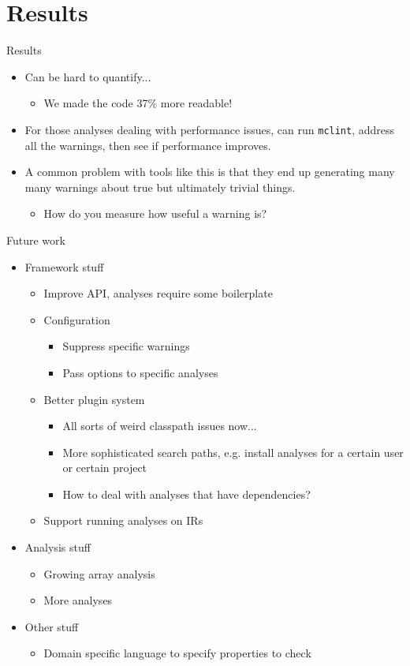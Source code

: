 \documentclass{beamer}
\begin{document}
\section{Results}
\begin{frame}{Results}
\begin{itemize}
\item Can be hard to quantify...
    \begin{itemize}
    \item We made the code 37\% more readable!
    \end{itemize}
\item For those analyses dealing with performance issues, 
can run {\tt mclint}, address all the warnings, then see if performance
improves.
\item A common problem with tools like this is that they end up generating
many many warnings about true but ultimately trivial things.
    \begin{itemize}
    \item How do you measure how useful a warning is?
    \end{itemize}
\end{itemize}
\end{frame}

\begin{frame}{Future work}
\begin{itemize}
\item Framework stuff
\begin{itemize}
    \item Improve API, analyses require some boilerplate
    \item Configuration
    \begin{itemize}
        \item Suppress specific warnings
        \item Pass options to specific analyses
    \end{itemize}
    \item Better plugin system
    \begin{itemize}
        \item All sorts of weird classpath issues now...
        \item More sophisticated search paths, e.g. install analyses
            for a certain user or certain project
        \item How to deal with analyses that have dependencies?
    \end{itemize}
    \item Support running analyses on IRs
\end{itemize}
\item Analysis stuff
\begin{itemize}
    \item Growing array analysis
    \item More analyses
\end{itemize}
\item Other stuff
\begin{itemize}
    \item Domain specific language to specify properties to check
\end{itemize}
\end{itemize}
\end{frame}
\end{document}
